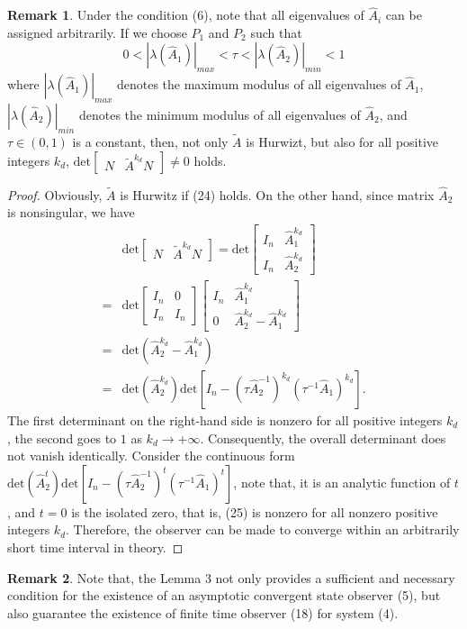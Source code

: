 \documentclass[english]{cccconf}
\theoremstyle{definition}
\newtheorem{remark}{Remark}
\begin{document}
\begin{remark} Under the condition (6), note that all eigenvalues of $\hat{A}_i$ can be assigned arbitrarily. If we choose $P_1$ and $P_2$ such that
\begin{equation}
0<|\lambda(\hat{A}_1)|_{max}<\tau<|\lambda(\hat{A}_2)|_{min}<1
\end{equation}
where $|\lambda(\hat{A}_1)|_{max}$ denotes the maximum modulus of all eigenvalues of $\hat{A}_1$, $|\lambda(\hat{A}_2)|_{min}$ denotes the minimum modulus of all eigenvalues of $\hat{A}_2$, and $\tau\in(0,1)$ is a constant, then, not only $\tilde{A}$ is Hurwizt, but also for all positive integers $k_d$,
$\textrm{det}\begin{bmatrix}
N&\tilde{A}^{k_d}N
\end{bmatrix}\neq 0$
 holds.
\end{remark}
\begin{proof}
Obviously, $\tilde{A}$ is Hurwitz if (24) holds. On the other hand, since matrix $\hat{A}_2$ is nonsingular, we have
\begin{equation}\begin{split}
&\textrm{det}\begin{bmatrix}
N&\tilde{A}^{k_d}N
\end{bmatrix}=\textrm{det}\begin{bmatrix}
I_n&\hat{A}^{k_d}_1\\I_n&\hat{A}^{k_d}_2
\end{bmatrix}\\
=&\textrm{det}\begin{bmatrix}
I_n&0\\I_n&I_n
\end{bmatrix}\begin{bmatrix}
I_n&\hat{A}^{k_d}_1\\0&\hat{A}^{k_d}_2-\hat{A}^{k_d}_1
\end{bmatrix}\\
=&\textrm{det}(\hat{A}^{k_d}_2-\hat{A}^{k_d}_1)\\
=&\textrm{det}(\hat{A}_2^{k_d})\textrm{det}[I_n-(\tau\hat{A}_2^{-1})^{k_d}(\tau^{-1}\hat{A}_1)^{k_d}].
\end{split}\end{equation}
The first determinant on the right-hand side is nonzero for all positive integers $k_d$, the second goes to $1$ as $k_d\rightarrow +\infty$. Consequently, the overall determinant does not vanish identically.  Consider the continuous form $\textrm{det}(\hat{A}_2^{t})\textrm{det}[I_n-(\tau\hat{A}_2^{-1})^{t}(\tau^{-1}\hat{A}_1)^{t}]$, note that, it is an analytic function of $t$, and $t=0$ is the isolated zero, that is, (25) is nonzero for all nonzero positive integers $k_d$. Therefore, the observer can be made to converge  within an arbitrarily short time interval in theory.
\end{proof}
\begin{remark}
 Note that, the Lemma 3 not only provides a sufficient and necessary condition for the existence of an asymptotic convergent state observer (5), but also guarantee the existence of finite time observer (18) for system (4).
\end{remark}
\end{document}
